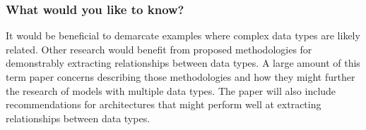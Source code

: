 \subsubsection{What would you like to know?}

It would be beneficial to demarcate examples where complex data types are likely related.  Other research would benefit from proposed methodologies for demonstrably extracting relationships between data types.  A large amount of this term paper concerns describing those methodologies and how they might further the research of models with multiple data types.  The paper will also include recommendations for architectures that might perform well at extracting relationships between data types.



